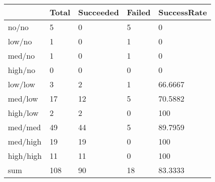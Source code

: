 \begin{tabular}{lllll}
& Total & Succeeded & Failed & SuccessRate \\ 
\hline 
no/no & 5 & 0 & 5 & 0 \\ 
low/no & 1 & 0 & 1 & 0 \\ 
med/no & 1 & 0 & 1 & 0 \\ 
high/no & 0 & 0 & 0 & 0 \\ 
low/low & 3 & 2 & 1 & 66.6667 \\ 
med/low & 17 & 12 & 5 & 70.5882 \\ 
high/low & 2 & 2 & 0 & 100 \\ 
med/med & 49 & 44 & 5 & 89.7959 \\ 
med/high & 19 & 19 & 0 & 100 \\ 
high/high & 11 & 11 & 0 & 100 \\ 
sum & 108 & 90 & 18 & 83.3333 \\ 
\hline 
\end{tabular}